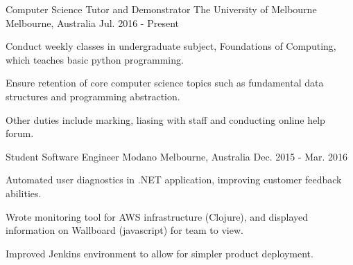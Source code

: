 \begin{cventries}
  \cventry
    {Computer Science Tutor and Demonstrator}
    {The University of Melbourne}
    {Melbourne, Australia}
    {Jul. 2016 - Present}
    {
      \begin{cvitems}
        \item {Conduct weekly classes in undergraduate subject, Foundations of Computing, which teaches basic python programming.}
        \item {Ensure retention of core computer science topics such as fundamental data structures and programming abstraction.}
        \item {Other duties include marking, liasing with staff and conducting online help forum.}
      \end{cvitems}
    }
  \cventry
    {Student Software Engineer}
    {Modano}
    {Melbourne, Australia}
    {Dec. 2015 - Mar. 2016}
    {
      \begin{cvitems}
        \item{Automated user diagnostics in .NET application, improving customer feedback abilities.}
        \item{Wrote monitoring tool for AWS infrastructure (Clojure), and displayed information on Wallboard (javascript) for team to view.}
        \item{Improved Jenkins environment to allow for simpler product deployment.}
      \end{cvitems}
    }
\end{cventries}
\vspace{-5mm}
